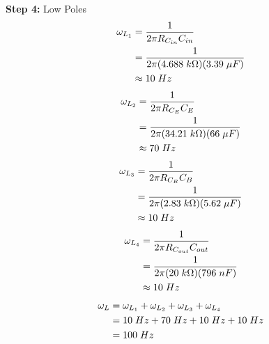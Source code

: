 \documentclass{article}
\begin{document}
	\noindent\textbf{Step 4:} Low Poles\\
	\begin{align*}
		\omega_{L_1} &= \frac{1}{2\pi R_{C_{in}} C_{in}}\\
		&= \frac{1}{2\pi (4.688 \hspace{1mm} k\Omega)(3.39 \hspace{1mm} \mu F)}\\
		&\approx 10 \hspace{1mm} Hz\\ 
	\end{align*}
	\begin{align*}
		\omega_{L_2} &= \frac{1}{2\pi R_{C_{E}} C_{E}}\\
		&= \frac{1}{2\pi (34.21 \hspace{1mm} k\Omega)(66 \hspace{1mm} \mu F)}\\
		&\approx 70 \hspace{1mm} Hz\\
	\end{align*}
	\begin{align*}
		\omega_{L_3} &= \frac{1}{2\pi R_{C_{B}} C_{B}}\\
		&= \frac{1}{2\pi (2.83 \hspace{1mm} k\Omega)(5.62 \hspace{1mm} \mu F)}\\
		&\approx 10 \hspace{1mm} Hz\\
	\end{align*}
	\begin{align*}
		\omega_{L_4} &= \frac{1}{2\pi R_{C_{out}} C_{out}}\\
		&= \frac{1}{2\pi (20 \hspace{1mm} k\Omega)(796 \hspace{1mm} nF)}\\
		&\approx 10 \hspace{1mm} Hz\\
	\end{align*}
	\begin{align*}
		\omega_L &= \omega_{L_1} + \omega_{L_2} + \omega_{L_3} + \omega_{L_4}\\
		&= 10 \hspace{1mm} Hz + 70 \hspace{1mm} Hz + 10 \hspace{1mm} Hz + 10 \hspace{1mm} Hz\\
		&= 100 \hspace{1mm} Hz\\		
	\end{align*}
	
\end{document}
